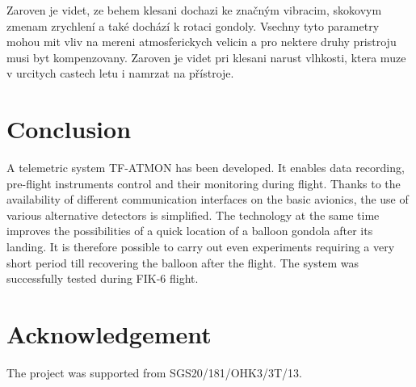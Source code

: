 \documentclass{Rpd}
\begin{document}
Zaroven je videt, ze behem klesani dochazi ke značným vibracim, skokovym zmenam zrychlení a také dochází k rotaci gondoly. Vsechny tyto parametry mohou mit vliv na mereni atmosferickych velicin a pro nektere druhy pristroju musi byt kompenzovany. Zaroven je videt pri klesani narust vlhkosti, ktera muze v urcitych castech letu i namrzat na přístroje.



\section{Conclusion}

A telemetric system TF-ATMON has been developed. It enables data recording, pre-flight instruments control and their monitoring during flight. Thanks to the availability of different communication interfaces on the basic avionics, the use of various alternative detectors is simplified. The technology at the same time improves the possibilities of a quick location of a balloon gondola after its landing. It is therefore possible to carry out even experiments requiring a very short period till recovering the balloon after the flight. The system was successfully tested during FIK-6 flight.



\section*{Acknowledgement}
The project was supported from  SGS20/181/OHK3/3T/13.
\end{document}
